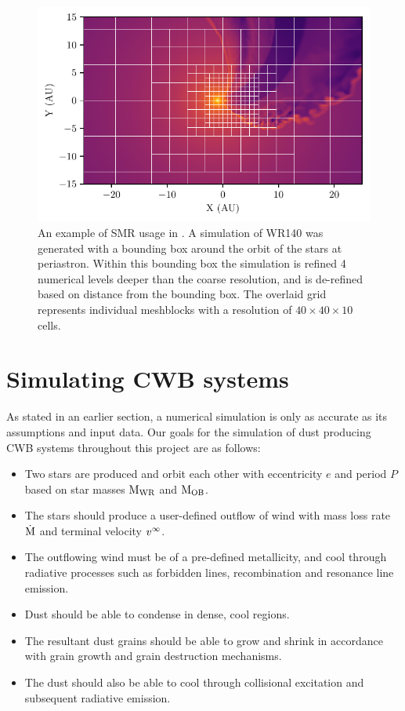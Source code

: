 \begin{figure}[ht]
  \centering
  \includegraphics{assets/refinement/wr140/gridref.pdf}
  \caption[Static mesh refinement in \athena]{An example of SMR usage in \athena. A simulation of WR140 was generated with a bounding box around the orbit of the stars at periastron. Within this bounding box the simulation is refined 4 numerical levels deeper than the coarse resolution, and is de-refined based on distance from the bounding box. The overlaid grid represents individual meshblocks with a resolution of $40\times 40 \times 10$ cells.}
  \label{fig:smr-example}
\end{figure}

\section{Simulating CWB systems}

As stated in an earlier section, a numerical simulation is only as accurate as its assumptions and input data.
Our goals for the simulation of dust producing CWB systems throughout this project are as follows:

\begin{itemize}
  \item Two stars are produced and orbit each other with eccentricity $e$ and period $P$ based on star masses $\text{M}_\text{WR}$ and $\text{M}_\text{OB}$.
  \item The stars should produce a user-defined outflow of wind with mass loss rate $\dot{\text{M}}$ and terminal velocity $v^\infty$.
  \item The outflowing wind must be of a pre-defined metallicity, and cool through radiative processes such as forbidden lines, recombination and resonance line emission.
  \item Dust should be able to condense in dense, cool regions.
  \item The resultant dust grains should be able to grow and shrink in accordance with grain growth and grain destruction mechanisms.
  \item The dust should also be able to cool through collisional excitation and subsequent radiative emission.
\end{itemize}

